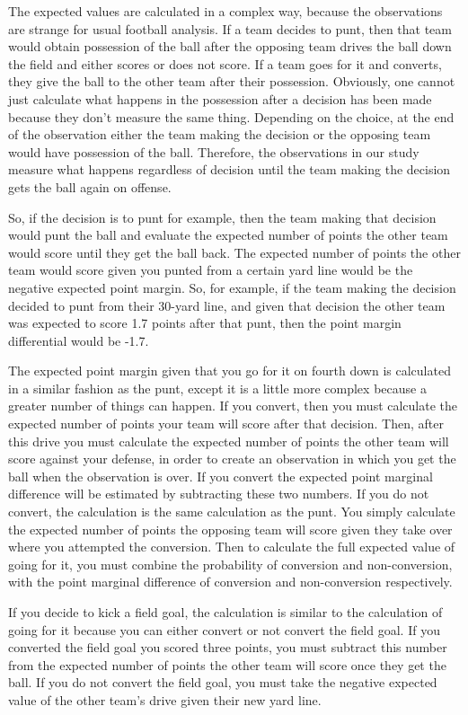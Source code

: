 \documentclass[letterpaper,10pt,english]{/anaconda/lib/python2.7/site-packages/sphinx/texinputs/sphinxhowto}
\begin{document}
The expected values are calculated in a complex way, because the
observations are strange for usual football analysis. If a team decides
to punt, then that team would obtain possession of the ball after the
opposing team drives the ball down the field and either scores or does
not score. If a team goes for it and converts, they give the ball to the
other team after their possession. Obviously, one cannot just calculate
what happens in the possession after a decision has been made because
they don't measure the same thing. Depending on the choice, at the end
of the observation either the team making the decision or the opposing
team would have possession of the ball. Therefore, the observations in
our study measure what happens regardless of decision until the team
making the decision gets the ball again on offense.

So, if the decision is to punt for example, then the team making that
decision would punt the ball and evaluate the expected number of points
the other team would score until they get the ball back. The expected
number of points the other team would score given you punted from a
certain yard line would be the negative expected point margin. So, for
example, if the team making the decision decided to punt from their
30-yard line, and given that decision the other team was expected to
score 1.7 points after that punt, then the point margin differential
would be -1.7.

The expected point margin given that you go for it on fourth down is
calculated in a similar fashion as the punt, except it is a little more
complex because a greater number of things can happen. If you convert,
then you must calculate the expected number of points your team will
score after that decision. Then, after this drive you must calculate the
expected number of points the other team will score against your
defense, in order to create an observation in which you get the ball
when the observation is over. If you convert the expected point marginal
difference will be estimated by subtracting these two numbers. If you do
not convert, the calculation is the same calculation as the punt. You
simply calculate the expected number of points the opposing team will
score given they take over where you attempted the conversion. Then to
calculate the full expected value of going for it, you must combine the
probability of conversion and non-conversion, with the point marginal
difference of conversion and non-conversion respectively.

If you decide to kick a field goal, the calculation is similar to the
calculation of going for it because you can either convert or not
convert the field goal. If you converted the field goal you scored three
points, you must subtract this number from the expected number of points
the other team will score once they get the ball. If you do not convert
the field goal, you must take the negative expected value of the other
team's drive given their new yard line.
\end{document}
